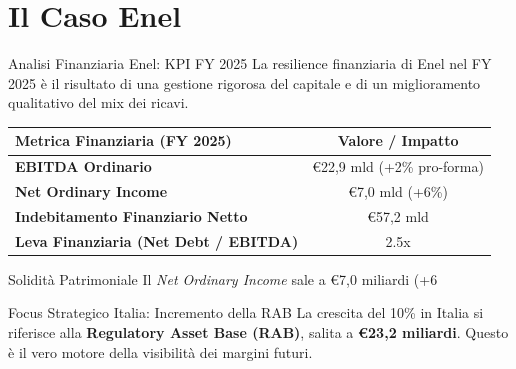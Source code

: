 
\section{Il Caso Enel}

\begin{frame}{Analisi Finanziaria Enel: KPI FY 2025}
    La resilience finanziaria di Enel nel FY 2025 è il risultato di una gestione rigorosa del capitale e di un miglioramento qualitativo del mix dei ricavi.
    \vspace{0.1cm}
    

    \begin{table}
        \centering
        \small
        \begin{tabular}{lc}
            \toprule
            \textbf{Metrica Finanziaria (FY 2025)} & \textbf{Valore / Impatto} \\
            \midrule
            \textbf{EBITDA Ordinario} & €22,9 mld (+2\% pro-forma) \\
            \textbf{Net Ordinary Income} & €7,0 mld (+6\%) \\
            \textbf{Indebitamento Finanziario Netto} & €57,2 mld \\
            \textbf{Leva Finanziaria (Net Debt / EBITDA)} & 2.5x \\
            \bottomrule
        \end{tabular}
    \end{table}
    \vspace{-0.1cm}
    \pause

    \begin{block}{Solidità Patrimoniale}
        Il \textit{Net Ordinary Income} sale a €7,0 miliardi (+6%
    \end{block}
    \pause

    \begin{block}{Focus Strategico Italia: Incremento della RAB}
        La crescita del 10\% in Italia si riferisce alla \textbf{Regulatory Asset Base (RAB)}, salita a \textbf{€23,2 miliardi}. Questo è il vero motore della visibilità dei margini futuri.
    \end{block}
\end{frame}


